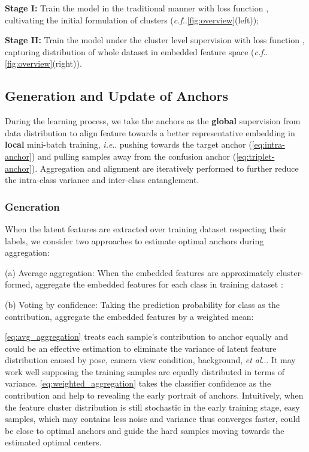 \documentclass[runningheads]{llncs}
\makeatletter
\DeclareRobustCommand\onedot{\futurelet\@let@token\@onedot}
\def\@onedot{\ifx\@let@token.\else.\null\fi\xspace}
\def\ie{\emph{i.e}\onedot} \def\Ie{\emph{I.e}\onedot}
\def\cf{\emph{c.f}\onedot} \def\Cf{\emph{C.f}\onedot}
\def\etal{\emph{et al}\onedot}
\makeatother
\begin{document}
\textbf{Stage I:} Train the model in the traditional manner with loss function , cultivating the initial formulation of clusters (\cf \cref{fig:overview}(left));

\textbf{Stage II:} Train the model under the cluster level supervision with loss function , capturing distribution of whole dataset in embedded feature space (\cf \cref{fig:overview}(right)).

\vspace*{-0.18cm}

\subsection{Generation and Update of Anchors}
During the learning process, we take the anchors as the \textbf{global} supervision from data distribution to align feature towards a better representative embedding in \textbf{local} mini-batch training, \ie pushing towards the target anchor (\cref{eq:intra-anchor}) and pulling samples away from the confusion anchor (\cref{eq:triplet-anchor}). Aggregation and alignment are iteratively performed  to further reduce the intra-class variance and inter-class entanglement.  


\vspace*{-0.48cm}
\subsubsection{Generation}
When the latent features are extracted over training dataset respecting their labels, we consider two approaches to estimate optimal anchors during aggregation:

(a) Average aggregation: When the embedded features are approximately cluster-formed, aggregate the embedded features  for each class in training dataset :


(b) Voting by confidence: Taking the prediction probability  for class  as the contribution, aggregate the embedded features by a weighted mean:


\cref{eq:avg_aggregation} treats each sample's contribution to anchor equally and could be an effective estimation to eliminate the variance of latent feature distribution caused by pose, camera view condition, background, \etal. It may work well supposing the training samples are equally distributed in terms of variance.
\cref{eq:weighted_aggregation} takes the classifier confidence as the contribution and help to revealing the early portrait of anchors. Intuitively, when the feature cluster distribution is still stochastic in the early training stage, easy samples, which may contains less noise and variance thus converges faster, could be close to optimal anchors and guide the hard samples moving towards the estimated optimal centers.
\end{document}
